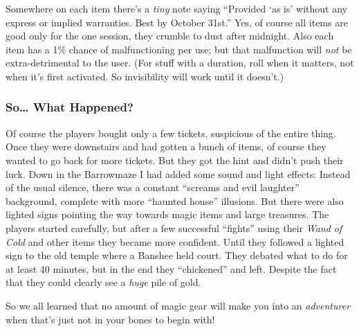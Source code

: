 Somewhere on each item there's a \emph{tiny} note saying ``Provided `as is'
without any express or implied warranties. Best by October 31st.'' Yes, of
course all items are good only for the one session, they crumble to dust after
midnight. Also each item has a 1\% chance of malfunctioning per use; but that
malfunction will \emph{not} be extra-detrimental to the user. (For stuff with
a duration, roll when it matters, not when it's first activated. So invisibility
will work until it doesn't.)

\subsubsection{So\dots{} What Happened?}

Of course the players bought only a few tickets, suspicious of the entire thing.
Once they were downstairs and had gotten a bunch of items, of course they wanted
to go back for more tickets. But they got the hint and didn't push their luck.
Down in the Barrowmaze I had added some sound and light effects: Instead of the
usual silence, there was a constant ``screams and evil laughter'' background,
complete with more ``haunted house'' illusions. But there were also lighted
signs pointing the way towards magic items and large treasures. The players
started carefully, but after a few successful ``fights'' using their
\emph{Wand of Cold} and other items they became more confident. Until they
followed a lighted sign to the old temple where a Banshee held court. They
debated what to do for at least 40 minutes, but in the end they ``chickened''
and left. Despite the fact that they could clearly see a \emph{huge} pile of
gold.

So we all learned that no amount of magic gear will make you into an
\emph{adventurer} when that's just not in your bones to begin with!

\endinput
